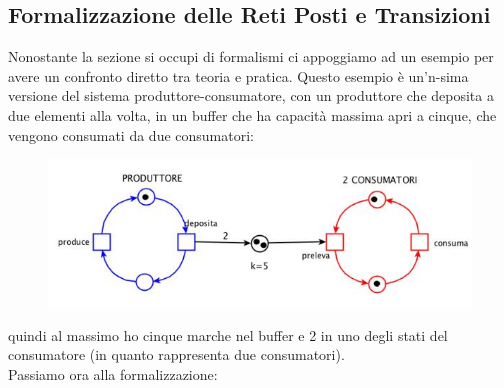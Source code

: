 \documentclass[a4paper,12pt, oneside]{book}
\begin{document}
\subsection{Formalizzazione delle Reti Posti e Transizioni}
Nonostante la sezione si occupi di formalismi ci appoggiamo ad un esempio per
avere un confronto diretto tra teoria e pratica. Questo esempio è un'n-sima
versione del sistema produttore-consumatore, con un produttore che deposita
a due elementi alla volta, in un buffer che ha capacità massima apri a cinque,
che vengono consumati da due consumatori:
\begin{figure}[H]
  \centering
  \includegraphics[scale = 0.65]{img/pt20.jpg}
\end{figure}
quindi al massimo ho cinque marche nel buffer e 2 in uno degli stati del
consumatore (in quanto rappresenta due consumatori).\\
Passiamo ora alla formalizzazione:
\end{document}
